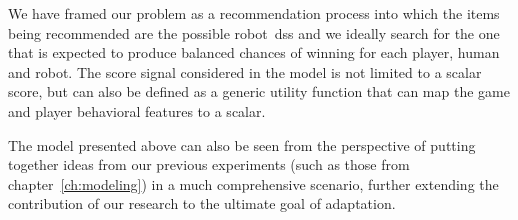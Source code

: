 We have framed our problem as a recommendation process into which the items being recommended are the possible robot~\glspl{ds} and we ideally search for the one that is expected to produce balanced chances of winning for each player, \ie human and robot. The score signal considered in the model is not limited to a scalar score, but can also be defined as a generic utility function that can map the game and player behavioral features to a scalar. 

The model presented above can also be seen from the perspective of putting together ideas from our previous experiments (such as those from chapter~\ref{ch:modeling}) in a much comprehensive scenario, further extending the contribution of our research to the ultimate goal of adaptation.